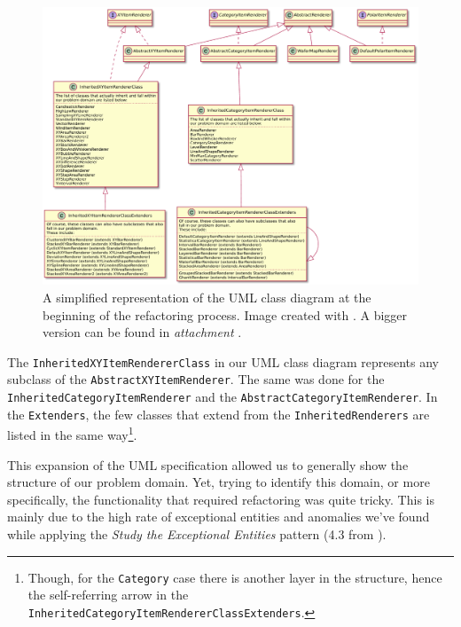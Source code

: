 \documentclass[11pt]{article}
\begin{document}
	\begin{figure}[H]
		\centering
		\includegraphics[width=\textwidth]{pictures/class-diagram-begin.pdf}
		\caption{A simplified representation of the UML class diagram at the beginning of the refactoring process. Image created with \cite{plantuml}. A bigger version can be found in \textsl{attachment \pageref{class-diagram-begin}}.}
		\label{fig:UML-start}
	\end{figure}
	
	The \texttt{InheritedXYItemRendererClass} in our UML class diagram represents any subclass of the \texttt{AbstractXYItemRenderer}. The same was done for the \texttt{InheritedCategoryItemRenderer} and the \texttt{AbstractCategoryItemRenderer}. In the \texttt{Extenders}, the few classes that extend from the \texttt{InheritedRenderers} are listed in the same way\footnote{Though, for the \texttt{Category} case there is another layer in the structure, hence the self-referring arrow in the \texttt{InheritedCategoryItemRendererClassExtenders}.}.
	
	This expansion of the UML specification allowed us to generally show the structure of our problem domain. Yet, trying to identify this domain, or more specifically, the functionality that required refactoring was quite tricky. This is mainly due to the high rate of exceptional entities and anomalies we've found while applying the \textsl{Study the Exceptional Entities} pattern (4.3 from \cite{demeyer2009object}).
	
\end{document}
